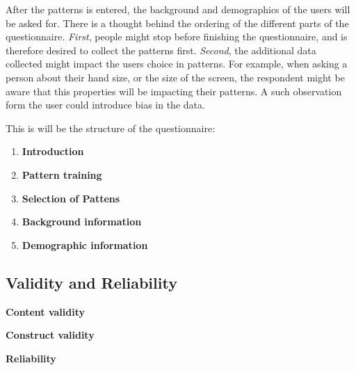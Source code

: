     After the patterns is entered, the background and demographics of the users will be asked for. There is a thought behind the ordering of the different parts of the questionnaire. {\it First}, people might stop before finishing the questionnaire, and is therefore desired to collect the patterns first. {\it Second}, the additional data collected might impact the users choice in patterns. For example, when asking a person about their hand size, or the size of the screen, the respondent might be aware that this properties will be impacting their patterns. A such observation form the user could introduce bias in the data.

    This is will be the structure of the questionnaire:

    \begin{enumerate}
      \item {\bf Introduction}
      \item {\bf Pattern training}
      \item {\bf Selection of Pattens}
      \item {\bf Background information}    
      \item {\bf Demographic information}
    \end{enumerate}

  \subsection{Validity and Reliability}\label{sec:validityandreliability}

    {\bf Content validity}

    {\bf Construct validity}

    {\bf Reliability}

  


 

  

  


